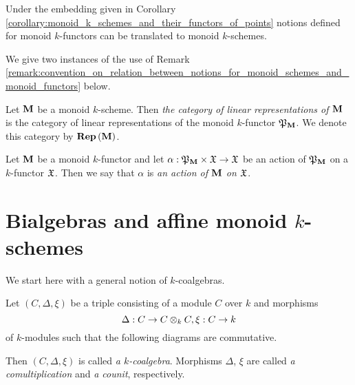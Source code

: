 \begin{remark}\label{remark:convention_on_relation_between_notions_for_monoid_schemes_and_monoid_functors}
Under the embedding given in Corollary \ref{corollary:monoid_k_schemes_and_their_functors_of_points} notions defined for monoid $k$-functors can be translated to monoid $k$-schemes.
\end{remark}
\noindent
We give two instances of the use of Remark \ref{remark:convention_on_relation_between_notions_for_monoid_schemes_and_monoid_functors} below.

\begin{definition}
Let $\mathbf{M}$ be a monoid $k$-scheme. Then \textit{the category of linear representations of $\mathbf{M}$} is the category of linear representations of the monoid $k$-functor ${\mathfrak P}_{\mathbf{M}}$. We denote this category by $\mathbf{Rep}\left(\mathbf{M}\right)$.
\end{definition}

\begin{definition}
Let $\mathbf{M}$ be a monoid $k$-functor and let $\alpha:{\mathfrak P}_{\mathbf{M}}\times {\mathfrak X}\rightarrow {\mathfrak X}$ be an action of ${\mathfrak P}_{\mathbf{M}}$ on a $k$-functor ${\mathfrak X}$. Then we say that $\alpha$ is \textit{an action of $\mathbf{M}$ on ${\mathfrak X}$}.
\end{definition}

\section{Bialgebras and affine monoid $k$-schemes}
\noindent
We start here with a general notion of $k$-coalgebras.

\begin{definition}
Let $(C,\Delta,\xi)$ be a triple consisting of a module $C$ over $k$ and morphisms
$$\Delta:C \rightarrow C\otimes_{k} C,\xi:C\rightarrow k$$
of $k$-modules such that the following diagrams are commutative.
\begin{center}
\end{center}
Then $(C,\Delta,\xi)$ is called \textit{a $k$-coalgebra}. Morphisms $\Delta$, $\xi$ are called \textit{a comultiplication} and \textit{a counit}, respectively.
\end{definition}

